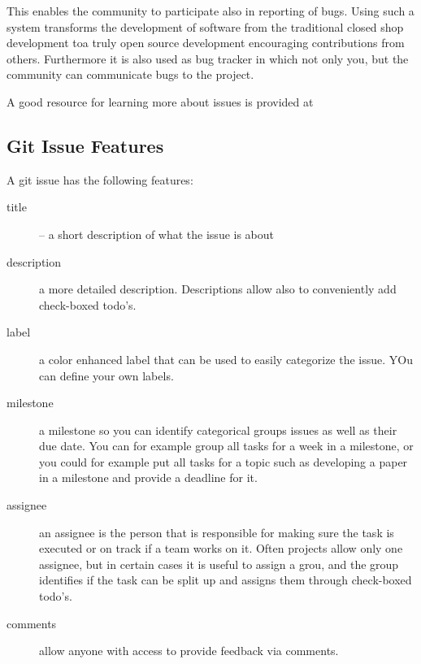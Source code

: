 This enables the community to participate also in reporting of
bugs. Using such a system transforms the development of software from
the traditional closed shop development toa truly open source
development encouraging contributions from others. Furthermore it is
also used as bug tracker in which not only you, but the community can
communicate bugs to the project.


\begin{comment}
Figure ?? shows where to find the link to the git issues. An
example issue list is shown in Figure ??.
\end{comment}

A good resource for learning more about issues is provided at 


\subsection{Git Issue Features}

A git issue has the following features:

\begin{description}
\item [title] -- a short description of what the issue is about
\item [description] a more detailed description. Descriptions allow
  also to conveniently add check-boxed todo's.
\item [label] a color enhanced label that can be used to easily
  categorize the issue. YOu can define your own labels.
\item [milestone] a milestone so you can identify categorical groups
  issues as well as their due date. You can for example group all
  tasks for a week in a milestone, or you could for example put all
  tasks for a topic such as developing a paper in a milestone and
  provide a deadline for it.
\item[assignee] an assignee is the person that is responsible for
  making sure the task is executed or on track if a team works on
  it. Often projects allow only one assignee, but in certain cases it
  is useful to assign a grou, and the group identifies if the task can
  be split up and assigns them through check-boxed todo's.
\item [comments] allow anyone with access to provide feedback via
  comments.
\end{description}

